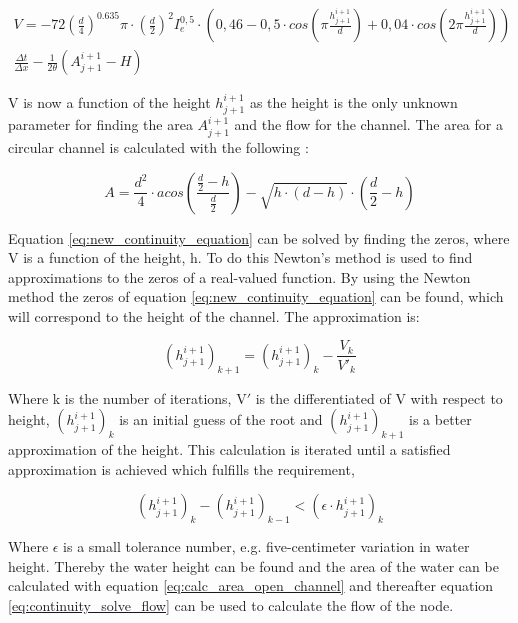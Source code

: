\begin{multline}\label{eq:new_continuity_equation}
    V = -72\left(\frac{d}{4}\right)^{0.635}\pi\cdot\left(\frac{d}{2}\right)^2I_e^{0,5}\cdot \left(0,46-0,5\cdot cos\left(\pi \frac{h_{j+1}^{i+1}}{d}\right)+ 0,04\cdot cos\left(2\pi\frac{h_{j+1}^{i+1}}{d}\right)\right)\\ \frac{\Delta t}{\Delta x}-\frac{1}{2\theta}\left(A_{j+1}^{i+1}-H\right)
\end{multline}

V is now a function of the height $h_{j+1}^{i+1}$ as the height is the only unknown parameter for finding the area $A_{j+1}^{i+1}$ and the flow for the channel. The area for a circular channel is calculated with the following \cite{ikke_stationear}:

\begin{equation}\label{eq:calc_area_open_channel}
    A = \frac {d^2}{4} \cdot acos \left(\frac{\frac{d}{2}-h}{\frac{d}{2}}\right)-\sqrt{h\cdot (d-h)}\cdot  \left(\frac{d}{2}-h\right)
\end{equation}

Equation \ref{eq:new_continuity_equation} can be solved by finding the zeros, where V is a function of the height, h. To do this Newton's method is used to find approximations to the zeros of a real-valued function. By using the Newton method the zeros of equation \ref{eq:new_continuity_equation} can be found, which will correspond to the height of the channel. The approximation is:

\begin{equation}
     (h_{j+1}^{i+1})_{k+1} =(h_{j+1}^{i+1})_{k} - \frac{V_k}{V'_k}
\end{equation}

Where k is the number of iterations, V$'$ is the differentiated of V with respect to height, $(h_{j+1}^{i+1})_{k}$ is an initial guess of the root and $(h_{j+1}^{i+1})_{k+1}$ is a better approximation of the height. This calculation is iterated until a satisfied approximation is achieved which fulfills the requirement,

\begin{equation}
    \left(h_{j+1}^{i+1}\right)_{k}-(h_{j+1}^{i+1})_{k-1} < (\epsilon \cdot h_{j+1}^{i+1})_{k}
\end{equation}

Where $\epsilon$ is a small tolerance number, e.g. five-centimeter variation in water height. Thereby the water height can be found and the area of the water can be calculated with equation \ref{eq:calc_area_open_channel}  and thereafter equation \ref{eq:continuity_solve_flow} can be used to calculate the flow of the node.

